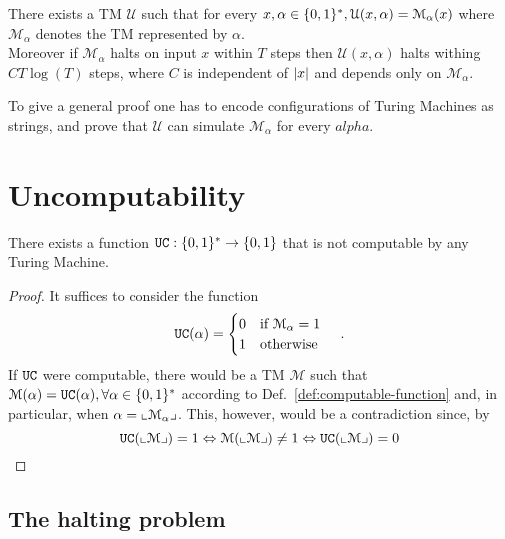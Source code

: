 \begin{theorem}
	There exists a TM $\mathcal{U}$ such that for every  $x, \alpha \in \{ 0,1 \}^* , \mathcal{U}(x,\alpha) = \mathcal{M}_{\alpha}(x)$ where $\mathcal{M}_{\alpha}$ denotes the TM represented by $\alpha$.\\
	Moreover if $\mathcal{M}_{\alpha}$ halts on input $x$ within $T$ steps then $\mathcal{U}(x, \alpha)$ halts withing $CT \log(T)$ steps, where $C$ is independent of $\left \lvert x \right \rvert$ and depends only on $\mathcal{M}_{\alpha}$.
\end{theorem}

To give a general proof one has to encode configurations of Turing Machines as
strings, and prove that $\mathcal{U}$ can simulate $\mathcal{M}_{\alpha}$ for every
$alpha$.

\section{Uncomputability}

\begin{theorem}
	There exists a function $\UC : \binstrings \to \binset$ that is not computable by any Turing Machine.
	\label{thm:uc-uncomputability}
\end{theorem}
\begin{proof}
	It suffices to consider the function
	\begin{equation}
		\UC (\alpha) =
		\begin{cases}
			0 \quad \text{if } \mathcal{M}_{\alpha} = 1 \\
			1 \quad \text{otherwise}
		\end{cases} \, .
		\label{eq:uc-function}
	\end{equation}
	If $\UC$ were computable, there would be a TM $\mathcal{M}$ such that $\mathcal{M}(\alpha) = \UC(\alpha), \forall \alpha \in \binstrings$ according to Def.~\ref{def:computable-function} and, in particular, when $\alpha = \llcorner \mathcal{M}_{\alpha} \lrcorner$. This, however, would be a contradiction since, by
	\eq{\ref{eq:uc-function}}
	\[
		\UC(\enc{\mathcal{M}}) = 1 \iff \mathcal{M}(\enc{\mathcal{M}}) \neq 1 \iff \UC(\enc{\mathcal{M}}) = 0
	\]
\end{proof}

\subsection{The halting problem}


